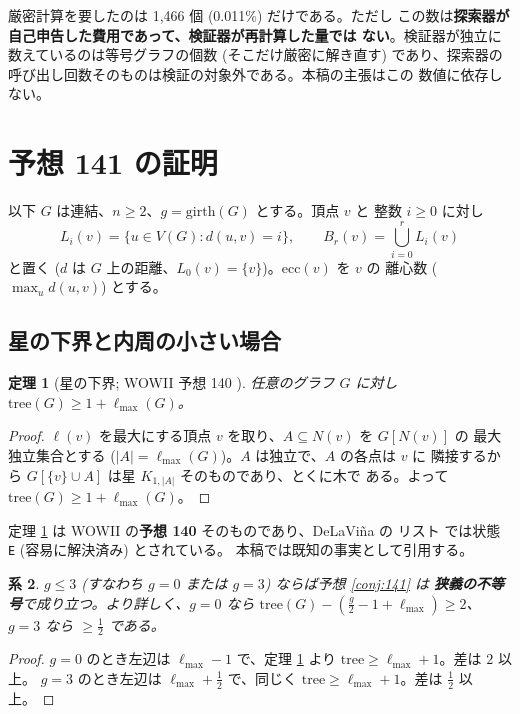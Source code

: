 \documentclass[paper=a4,fontsize=10.5pt,jafontsize=10.5pt]{jlreq}
\theoremstyle{plain}
\newtheorem{theorem}{定理}[section]
\newtheorem{corollary}[theorem]{系}
\theoremstyle{definition}
\begin{document}
厳密計算を要したのは 1,466 個 (0.011\%) だけである。ただし
この数は\textbf{探索器が自己申告した費用であって、検証器が再計算した量では
ない}。検証器が独立に数えているのは等号グラフの個数 (そこだけ厳密に解き直す)
であり、探索器の呼び出し回数そのものは検証の対象外である。本稿の主張はこの
数値に依存しない。

\section{予想 141 の証明}\label{sec:proof}

以下 $G$ は連結、$n \ge 2$、$g = \mathrm{girth}(G)$ とする。頂点 $v$ と
整数 $i \ge 0$ に対し
\[ L_i(v) = \{u \in V(G) : d(u,v) = i\}, \qquad
   B_r(v) = \bigcup_{i=0}^{r} L_i(v) \]
と置く ($d$ は $G$ 上の距離、$L_0(v) = \{v\}$)。$\mathrm{ecc}(v)$ を $v$ の
離心数 ($\max_u d(u,v)$) とする。

\subsection{星の下界と内周の小さい場合}

\begin{theorem}[星の下界; WOWII 予想 140 \cite{wowii}]\label{thm:star}
任意のグラフ $G$ に対し $\mathrm{tree}(G) \ge 1 + \ell_{\max}(G)$。
\end{theorem}

\begin{proof}
$\ell(v)$ を最大にする頂点 $v$ を取り、$A \subseteq N(v)$ を $G[N(v)]$ の
最大独立集合とする ($|A| = \ell_{\max}(G)$)。$A$ は独立で、$A$ の各点は $v$ に
隣接するから $G[\{v\} \cup A]$ は星 $K_{1,|A|}$ そのものであり、とくに木で
ある。よって $\mathrm{tree}(G) \ge 1 + \ell_{\max}(G)$。
\end{proof}

定理 \ref{thm:star} は WOWII の\textbf{予想 140} そのものであり、DeLaViña の
リスト \cite{wowii} では状態 \texttt{E} (容易に解決済み) とされている。
本稿では既知の事実として引用する。

\begin{corollary}\label{cor:small}
$g \le 3$ (すなわち $g = 0$ または $g = 3$) ならば予想 \ref{conj:141} は
\textbf{狭義の不等号}で成り立つ。より詳しく、$g = 0$ なら
$\mathrm{tree}(G) - (\tfrac{g}{2} - 1 + \ell_{\max}) \ge 2$、
$g = 3$ なら $\ge \tfrac{1}{2}$ である。
\end{corollary}

\begin{proof}
$g = 0$ のとき左辺は $\ell_{\max} - 1$ で、定理 \ref{thm:star} より
$\mathrm{tree} \ge \ell_{\max} + 1$。差は $2$ 以上。
$g = 3$ のとき左辺は $\ell_{\max} + \tfrac{1}{2}$ で、同じく
$\mathrm{tree} \ge \ell_{\max} + 1$。差は $\tfrac{1}{2}$ 以上。
\end{proof}
\end{document}
